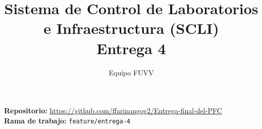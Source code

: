 \documentclass[12pt,a4paper]{article}
\title{Sistema de Control de Laboratorios e Infraestructura (SCLI)\\Entrega 4}
\author{Equipo FUVV}
\date{}
\begin{document}
\maketitle
\begin{center}
  \textbf{Repositorio:} \url{https://github.com/ffarinangog2/Entrega-final-del-PFC}\\
  \textbf{Rama de trabajo:} \texttt{feature/entrega-4}
\end{center}
\tableofcontents
\newpage








\end{document}
